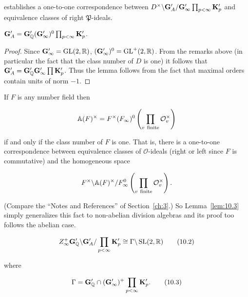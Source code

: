 establishes a one-to-one correspondence between $D^{\times}\backslash \mathbf{G}'_A/\mathbf{G}'_\infty \prod_{p < \infty} \mathbf{K}'_p$ and equivalence classes of right $\mathfrak{P}$-ideals.

\begin{lemma}\label{lem:10.3}

$\mathbf{G}'_A = \mathbf{G}'_{\mathbb{Q}}(\mathbf{G}'_\infty)^{0}\prod_{p < \infty}\mathbf{K}'_p$.

\end{lemma}

\begin{proof}

Since $\mathbf{G}'_\infty = \operatorname{GL}(2, \mathbb{R})$, $(\mathbf{G}'_\infty)^{0} = \operatorname{GL}^{+}(2, \mathbb{R})$. From the remarks above (in particular the fact that the class number of $D$ is one) it follows that $\mathbf{G}'_A = \mathbf{G}'_{\mathbb{Q}} \mathbf{G}'_\infty \prod \mathbf{K}'_p$. Thus the lemma follows from the fact that maximal orders contain units of norm $-1$.

\end{proof}

\begin{remark*}

If $F$ is any number field then

\[
\mathbb{A}(F)^{\times} = F^{\times}(F_\infty)^{0}\left(\prod_{v\ \text{finite}} \mathcal{O}_v^{\times}\right)
\]

if and only if the class number of $F$ is one. That is, there is a one-to-one correspondence between equivalence classes of $\mathcal{O}$-ideals (right or left since $F$ is commutative) and the homogeneous space

\[
F^{\times}\backslash \mathbb{A}(F)^{\times}/F_\infty^{0}\left(\prod_{v\ \text{finite}} \mathcal{O}_v^{\times}\right).
\]

(Compare the ``Notes and References'' of Section~\ref{ch:3}.) So Lemma~\ref{lem:10.3} simply generalizes this fact to non-abelian division algebras and its proof too follows the abelian case.

\end{remark*}

\begin{corollary*}

\[
Z_\infty^+ \mathbf{G}'_{\mathbb{Q}} \backslash \mathbf{G}'_A / \prod_{p < \infty} \mathbf{K}'_p \cong \Gamma \backslash \operatorname{SL}(2, \mathbb{R})\tag{10.2}
\]

where

\[
\Gamma = \mathbf{G}'_{\mathbb{Q}} \cap (\mathbf{G}'_\infty)^+ \prod_{p < \infty} \mathbf{K}'_p.\tag{10.3}
\]

\end{corollary*}

